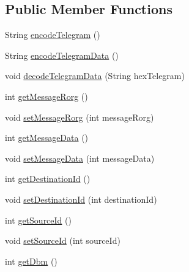 \subsection*{Public Member Functions}
\begin{DoxyCompactItemize}
\item 
String \hyperlink{classch_1_1bfh_1_1gr33nopo55um_1_1enocean_1_1telegram_1_1_radio802_ae1032a631a54c5c367ae6af91ba052d8}{encode\+Telegram} ()
\item 
String \hyperlink{classch_1_1bfh_1_1gr33nopo55um_1_1enocean_1_1telegram_1_1_radio802_a47f39507aeaad32488ce6f4e623757b6}{encode\+Telegram\+Data} ()
\item 
void \hyperlink{classch_1_1bfh_1_1gr33nopo55um_1_1enocean_1_1telegram_1_1_radio802_a36a30df4b04981aa53be8481b9f0072a}{decode\+Telegram\+Data} (String hex\+Telegram)
\item 
int \hyperlink{classch_1_1bfh_1_1gr33nopo55um_1_1enocean_1_1telegram_1_1_radio802_a3e8bb4f865b93964a2eaa041081bde7f}{get\+Message\+Rorg} ()
\item 
void \hyperlink{classch_1_1bfh_1_1gr33nopo55um_1_1enocean_1_1telegram_1_1_radio802_a3622350b549a42806b39ab19ebdf915b}{set\+Message\+Rorg} (int message\+Rorg)
\item 
int \hyperlink{classch_1_1bfh_1_1gr33nopo55um_1_1enocean_1_1telegram_1_1_radio802_a9d723595d6d66dca270e800c1b8442a1}{get\+Message\+Data} ()
\item 
void \hyperlink{classch_1_1bfh_1_1gr33nopo55um_1_1enocean_1_1telegram_1_1_radio802_a8aacf8dd132fbf71005f452df70d84f7}{set\+Message\+Data} (int message\+Data)
\item 
int \hyperlink{classch_1_1bfh_1_1gr33nopo55um_1_1enocean_1_1telegram_1_1_radio802_a30391d582884efd4d5ab68b18b1f9c8d}{get\+Destination\+Id} ()
\item 
void \hyperlink{classch_1_1bfh_1_1gr33nopo55um_1_1enocean_1_1telegram_1_1_radio802_a822d35f33f68291c0335f34b75c7f45b}{set\+Destination\+Id} (int destination\+Id)
\item 
int \hyperlink{classch_1_1bfh_1_1gr33nopo55um_1_1enocean_1_1telegram_1_1_radio802_ae303dfab6de82de5c91988af159fbbd4}{get\+Source\+Id} ()
\item 
void \hyperlink{classch_1_1bfh_1_1gr33nopo55um_1_1enocean_1_1telegram_1_1_radio802_a5944cb36dc988a8e69999d43bf962602}{set\+Source\+Id} (int source\+Id)
\item 
int \hyperlink{classch_1_1bfh_1_1gr33nopo55um_1_1enocean_1_1telegram_1_1_radio802_a0e89a7ac96074f5a878ad5eb63a8b824}{get\+Dbm} ()

\end{DoxyCompactItemize}
